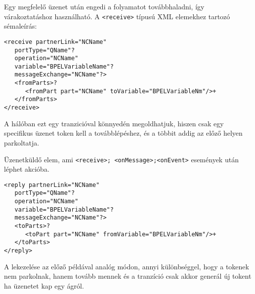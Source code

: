 Egy megfelelő üzenet után engedi a folyamatot továbbhaladni, így várakoztatáshoz használható. A \texttt{<receive>} típusú XML elemekhez tartozó sémaleírás:\\
\begin{verbatim}
<receive partnerLink="NCName"
   portType="QName"?
   operation="NCName"
   variable="BPELVariableName"?
   messageExchange="NCName"?>
   <fromParts>?
      <fromPart part="NCName" toVariable="BPELVariableNm"/>+
   </fromParts>
</receive>
\end{verbatim}
A hálóban ezt egy tranzicióval könnyedén megoldhatjuk, hiszen csak egy specifikus üzenet token kell a továbblépéshez, és a többit addig az előző helyen parkoltatja. 

Üzenetküldő elem, ami \texttt{<receive>; <onMessage>;<onEvent>} események után léphet akcióba. 
\begin{verbatim}
<reply partnerLink="NCName"
   portType="QName"?
   operation="NCName"
   variable="BPELVariableName"?
   messageExchange="NCName"?>
   <toParts>?
      <toPart part="NCName" fromVariable="BPELVariableNm"/>+
   </toParts>
</reply>
\end{verbatim}
A lekezelése az előző példával analóg módon, annyi különbséggel, hogy a tokenek nem parkolnak, hanem tovább mennek és a tranzíció csak akkor generál új tokent ha üzenetet kap egy ágról.
